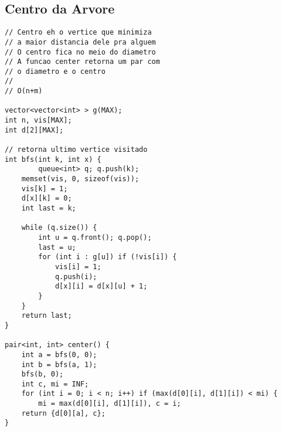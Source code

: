\documentclass[12pt, a4paper, twoside]{article}
\begin{document}
\subsection{Centro da Arvore}
\begin{lstlisting}
// Centro eh o vertice que minimiza
// a maior distancia dele pra alguem
// O centro fica no meio do diametro
// A funcao center retorna um par com
// o diametro e o centro
//
// O(n+m)

vector<vector<int> > g(MAX);
int n, vis[MAX];
int d[2][MAX];

// retorna ultimo vertice visitado
int bfs(int k, int x) {
        queue<int> q; q.push(k);
	memset(vis, 0, sizeof(vis));
	vis[k] = 1;
	d[x][k] = 0;
	int last = k;
	
	while (q.size()) {
		int u = q.front(); q.pop();
		last = u;
		for (int i : g[u]) if (!vis[i]) {
			vis[i] = 1;
			q.push(i);
			d[x][i] = d[x][u] + 1;
		}
	}
	return last;
}

pair<int, int> center() {
	int a = bfs(0, 0);
	int b = bfs(a, 1);
	bfs(b, 0);
	int c, mi = INF;
	for (int i = 0; i < n; i++) if (max(d[0][i], d[1][i]) < mi) {
		mi = max(d[0][i], d[1][i]), c = i;
	return {d[0][a], c};
}
\end{lstlisting}
\end{document}
